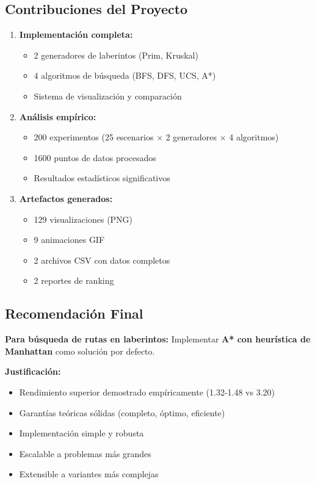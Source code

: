 \documentclass[12pt,a4paper]{article}
\begin{document}
\subsection{Contribuciones del Proyecto}

\begin{enumerate}
    \item \textbf{Implementación completa:}
    \begin{itemize}
        \item 2 generadores de laberintos (Prim, Kruskal)
        \item 4 algoritmos de búsqueda (BFS, DFS, UCS, A*)
        \item Sistema de visualización y comparación
    \end{itemize}
    
    \item \textbf{Análisis empírico:}
    \begin{itemize}
        \item 200 experimentos (25 escenarios × 2 generadores × 4 algoritmos)
        \item 1600 puntos de datos procesados
        \item Resultados estadísticos significativos
    \end{itemize}
    
    \item \textbf{Artefactos generados:}
    \begin{itemize}
        \item 129 visualizaciones (PNG)
        \item 9 animaciones GIF
        \item 2 archivos CSV con datos completos
        \item 2 reportes de ranking
    \end{itemize}
\end{enumerate}

\subsection{Recomendación Final}

\textbf{Para búsqueda de rutas en laberintos:} Implementar \textbf{A* con heurística de Manhattan} como solución por defecto.

\textbf{Justificación:}
\begin{itemize}
    \item Rendimiento superior demostrado empíricamente (1.32-1.48 vs 3.20)
    \item Garantías teóricas sólidas (completo, óptimo, eficiente)
    \item Implementación simple y robusta
    \item Escalable a problemas más grandes
    \item Extensible a variantes más complejas
\end{itemize}
\end{document}
